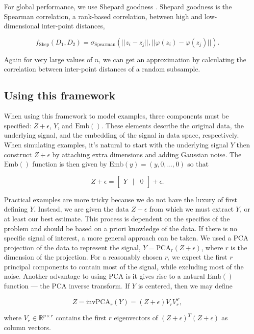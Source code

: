 \documentclass{article}
\begin{document}
For global performance, we use Shepard goodness \cite{quantitative survey}. Shepard goodness is the Spearman correlation, a rank-based correlation, between high and low-dimensional inter-point distances, \begin{linenomath}$$f_\textrm{Shep}(D_1, D_2) = \sigma_\textrm{Spearman}(||z_i - z_j||, ||\varphi(z_i) - \varphi(z_j)||).$$\end{linenomath} Again for very large values of $n$, we can get an approximation by calculating the correlation between inter-point distances of a random subsample.

\subsection{Using this framework}
When using this framework to model examples, three components must be specified: $Z + \epsilon$, $Y$, and $\textrm{Emb}()$. These elements describe the original data, the underlying signal, and the embedding of the signal in data space, respectively. When simulating examples, it's natural to start with the underlying signal $Y$ then construct $Z + \epsilon$ by attaching extra dimensions and adding Gaussian noise. The $\textrm{Emb}()$ function is then given by $\textrm{Emb}(y) = (y,0,\hdots,0)$ so that
\begin{linenomath}$$Z + \epsilon = \begin{bmatrix}
Y & \vert & 0
\end{bmatrix} + \epsilon.$$\end{linenomath}

Practical examples are more tricky because we do not have the luxury of first defining $Y$. Instead, we are given the data $Z + \epsilon$ from which we must extract $Y$, or at least our best estimate. This process is dependent on the specifics of the problem and should be based on a priori knowledge of the data. If there is no specific signal of interest, a more general approach can be taken. We used a PCA projection of the data to represent the signal, $Y = \textrm{PCA}_r(Z + \epsilon)$, where $r$ is the dimension of the projection. For a reasonably chosen $r$, we expect the first $r$ principal components to contain most of the signal, while excluding most of the noise. Another advantage to using PCA is it gives rise to a natural $\textrm{Emb}()$ function --- the PCA inverse transform. If $Y$ is centered, then we may define \begin{linenomath}$$Z = \textrm{invPCA}_r(Y) = (Z + \epsilon)V_rV_r^T,$$\end{linenomath} where $V_r \in \mathbb{R}^{p \times r}$ contains the first $r$ eigenvectors of $(Z+\epsilon)^T(Z+\epsilon)$ as column vectors.
\end{document}
